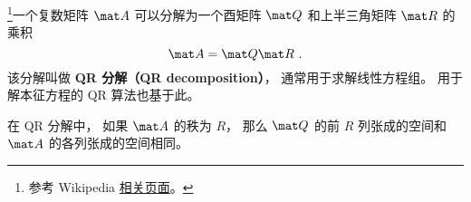 

\footnote{参考 Wikipedia \href{https://en.wikipedia.org/wiki/QR_decomposition}{相关页面}。}一个复数矩阵 $\mat A$ 可以分解为一个酉矩阵 $\mat Q$ 和上半三角矩阵 $\mat R$ 的乘积
\begin{equation}
\mat A = \mat Q\mat R~.
\end{equation}
该分解叫做 \textbf{QR 分解（QR decomposition）}， 通常用于求解线性方程组。 用于解本征方程的 QR 算法也基于此。

在 QR 分解中， 如果 $\mat A$ 的秩为 $R$， 那么 $\mat Q$ 的前 $R$ 列张成的空间和 $\mat A$ 的各列张成的空间相同。
